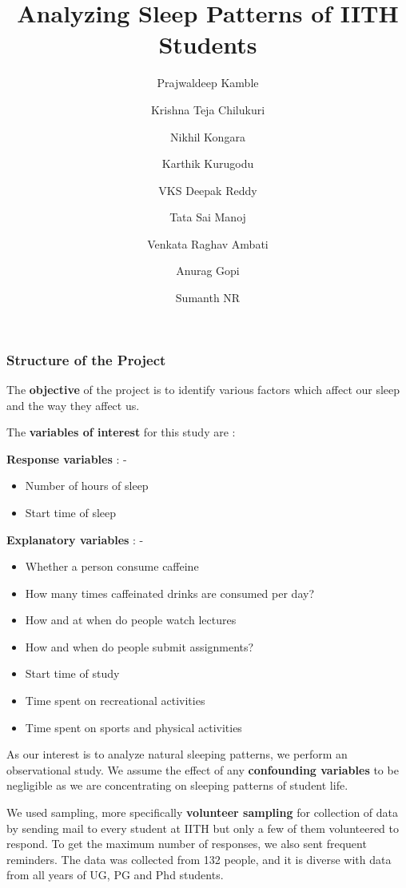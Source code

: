\documentclass[11pt,]{beamer}
\title[Sleep Patterns Analysis]{Analyzing Sleep Patterns of IITH Students}
\author[Group - 12]{Prajwaldeep Kamble \and Krishna Teja Chilukuri \and Nikhil Kongara \\ \and Karthik Kurugodu \and VKS Deepak Reddy \and Tata Sai Manoj \\ \and Venkata Raghav Ambati \and Anurag Gopi \and Sumanth NR}
\institute[IITH]{Indian Institute of Technology Hyderabad \\ \smallskip \large{Project No. 12}}
\begin{document}
\begin{frame}
	\titlepage
\end{frame}

\begin{frame}

    \frametitle{Structure of the Project}
    
    The \textbf{objective} of the project is to identify various factors which affect our sleep and the way they affect us. 
    
    \bigskip
    
    The \textbf{variables of interest} for this study are : 
    
    \bigskip
    
    \textbf{Response variables} : - 
    
    \begin{itemize}
    \item{Number of hours of sleep }
    \item{Start time of sleep}
    \end{itemize}
    
    \smallskip
    
    \textbf{Explanatory variables} : - 
    
    \begin{itemize}
        \item{Whether a person consume caffeine}
        \item{How many times caffeinated drinks are consumed per day?}
        \item{How and at when do people watch lectures}
        \item{How and when do people submit assignments?}
        \item{Start time of study}
        \item{Time spent on recreational activities}
        \item{Time spent on sports and physical activities}
    \end{itemize}
    
\end{frame}

\begin{frame}
    
    As our interest is to analyze natural sleeping patterns, we perform an observational study. We assume the effect of any \textbf{confounding variables} to be negligible as we are concentrating on sleeping patterns of student life.
    
    \bigskip
    
    We used sampling, more specifically \textbf{volunteer sampling} for collection of data by sending mail to every student at IITH but only a few of them volunteered to respond. To get the maximum number of responses, we also sent frequent reminders. The data was collected from 132 people, and it is diverse with data from all years of UG, PG and Phd students.
    
\end{frame}
\end{document}

